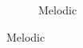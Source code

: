 \documentclass{article} %
\begin{document}
\begin{figure}
\begin{preview}
\begin{subfigure}[b]{.3\linewidth}
	\vspace*{-1.8em}
        \caption{\sffamily Melodic}
      \end{subfigure}
\end{preview}
\end{figure}
\end{document}
